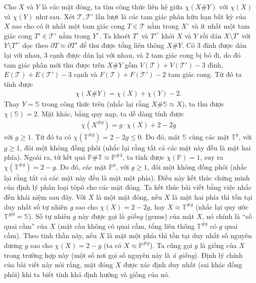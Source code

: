 \begin{multicols}{2}
	\vskip 0.1cm
	Cho $X$ và $Y$ là các mặt đóng, ta tìm công thức liên hệ giữa $\chi(X \# Y)$ với $\chi(X)$ và $\chi(Y)$ như sau. Xét $\mathscr{T},\mathscr{T}'$ lần lượt là các tam giác phân hữu hạn bất kỳ của $X$ sao cho có ít nhất một tam giác cong $T \in \mathscr{T}$ nằm trong $X^\circ$ và ít nhất một tam giác cong $T' \in \mathscr{T}'$ nằm trong $Y^\circ$. Ta khoét $T^{\circ}$ và $T'^{\circ}$ khỏi $X$ và $Y$ rồi dán $X \setminus T^\circ$ với $Y \setminus T'^{\circ}$ dọc theo $\partial T \approx \partial T'$ để thu được tổng liên thông $X \# Y$. Có $3$ đỉnh được dán lại với nhau, $3$ cạnh được dán lại với nhau, và $2$ tam giác cong bị bỏ đi, do đó tam giác phân mới thu được trên $X\#Y$ gồm $V(\mathscr{T}) + V(\mathscr{T}') - 3$ đỉnh, $E(\mathscr{T}) + E(\mathscr{T}') - 3$ cạnh và $F(\mathscr{T}) + F(\mathscr{T}') - 2$ tam giác cong. Từ đó ta tính được
	\begin{align*}
		\chi(X \# Y) = \chi(X) + \chi(Y) - 2.
	\end{align*}
	Thay $Y = \mathbb{S}$ trong công thức trên (nhắc lại rằng $X \# \mathbb{S} \approx X$), ta thu được $\chi(\mathbb{S}) = 2$. Mặt khác, bằng quy nạp, ta dễ dàng tính được
	\begin{align*}
		\chi(X^{\# g}) = g \cdot \chi(X) + 2 - 2g
	\end{align*}
	với $g \ge 1$. Từ đó ta có $\chi(\mathbb{T}^{\# g}) = 2-2g \le 0$. Do đó, mặt $\mathbb{S}$ cùng các mặt $\mathbb{T}^g$, với $g \ge 1$, đôi một không đồng phôi (nhắc lại rằng tất cả các mặt này đều là mặt hai phía).
	\vskip 0.1cm
	Ngoài ra, từ kết quả $\mathbb{P} \# \mathbb{T} \approx \mathbb{P}^{\# 3}$, ta tính được $\chi(\mathbb{P}) = 1$, suy ra $\chi(\mathbb{T}^{\# g}) = 2-g$. Do đó, các mặt $\mathbb{P}^g$, với $g \ge 1$, đôi một không đồng phôi (nhắc lại rằng tất cả các mặt này đều là mặt một phía). Điều này kết thúc chứng minh của định lý phân loại tôpô cho các mặt đóng.
	\vskip 0.1cm
	Ta kết thúc bài viết bằng việc nhắc đến khái niệm sau đây. Với $X$ là một mặt đóng, nếu $X$ là mặt hai phía thì tồn tại duy nhất số tự nhiên $g$ sao cho $\chi(X) = 2-2g$, hay $X \approx \mathbb{T}^{\#g}$ (nhắc lại quy ước $\mathbb{T}^{\# 0} = \mathbb{S}$). Số tự nhiên $g$ này được gọi là {\it giống} (genus) của mặt $X$, nó chính là ``số quai cầm'' của $X$ (mặt cầu không có quai cầm, tổng liên thông $\mathbb{T}^{\# g}$ có $g$ quai cầm). Theo tinh thần này, nếu $X$ là mặt một phía thì tồn tại duy nhất số nguyên dương $g$ sao cho $\chi(X) = 2-g$ (ta có $X \approx \mathbb{P}^{\# g}$). Ta cũng gọi $g$ là giống của $X$ trong trường hợp này (một số nơi gọi số nguyên này là {\it á giống}). Định lý chính của bài viết này nói rằng, mặt đóng $X$ được xác định duy nhất (sai khác đồng phôi) khi ta biết tính khả định hướng và giống của nó.
\end{multicols}
